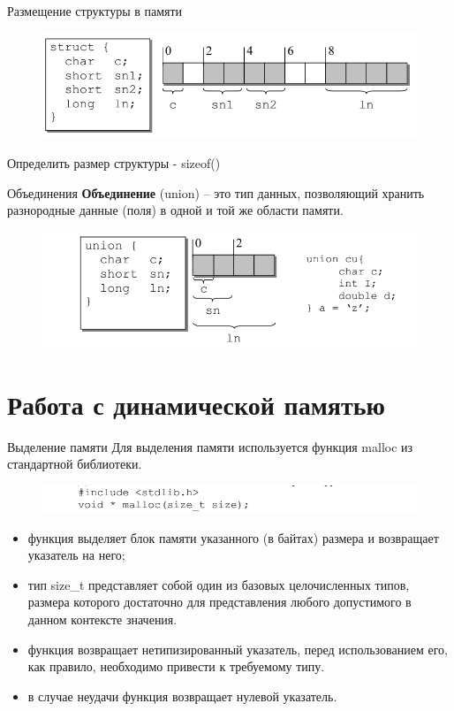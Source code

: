 \documentclass{beamer}
\begin{document}
\begin{frame}{Размещение структуры в памяти}
\begin{figure}[h]
\centering
\includegraphics[scale=0.6]{images/lec04-pic10.png}
\end{figure}
Определить размер структуры - sizeof()
\end{frame}

\begin{frame}{Объединения}
\textbf{Объединение} (union) – это тип данных, позволяющий хранить разнородные данные (поля) в одной и той же области памяти. 
\begin{figure}[h]
\centering
\includegraphics[scale=0.6]{images/lec04-pic11.png}
\end{figure}
\end{frame}

\section{Работа с динамической памятью}
\begin{frame}{Выделение памяти}
Для выделения памяти используется функция malloc из стандартной библиотеки.
\begin{figure}[h]
\centering
\includegraphics[scale=0.6]{images/lec04-pic12.png}
\end{figure}
\begin{itemize}
\item функция выделяет блок памяти указанного (в байтах) размера и
возвращает указатель на него;
\item тип size\_t представляет собой один из базовых целочисленных типов, размера которого достаточно для представления любого допустимого в данном контексте значения.
\item функция возвращает нетипизированный указатель,
перед использованием его, как правило, необходимо привести к требуемому типу.
\item в случае неудачи функция возвращает нулевой указатель.
\end{itemize}
\end{frame}
\end{document}

